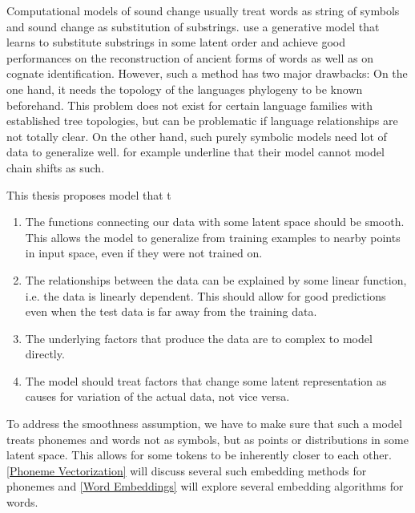 \documentclass[8pt]{article}
\begin{document}
Computational models of sound change usually treat words as string of symbols and sound change as substitution of substrings.\cite{bouchard2007probabilistic,bouchard2013automated} use a generative model that learns to substitute substrings in some latent order and achieve good performances on the reconstruction of ancient forms of words as well as on cognate identification. However, such a method has two major drawbacks: On the one hand, it needs the topology of the languages phylogeny to be known beforehand. This problem does not exist for certain language families with established tree topologies, but can be problematic if language relationships are not totally clear. On the other hand, such purely symbolic models need lot of data to generalize well. \cite{bouchard2007probabilistic} for example underline that their model cannot model chain shifts as such.

This thesis proposes model that t
\begin{enumerate}
\item The functions connecting our data with some latent space should be smooth. This allows the model to generalize from training examples to nearby points in input space, even if they were not trained on.
\item The relationships between the data can be explained by some linear function, i.e. the data is linearly dependent. This should allow for good predictions even when the test data is far away from the training data.
\item The underlying factors that produce the data are to complex to model directly. 
\item The model should treat factors that change some latent representation as causes for variation of the actual data, not vice versa.
\end{enumerate}

To address the smoothness assumption, we have to make sure that such a model treats phonemes and words not as symbols, but as points or distributions in some latent space. This allows for some tokens to be inherently closer to each other. \ref{Phoneme Vectorization} will discuss several such embedding methods for phonemes and \ref{Word Embeddings} will explore several embedding algorithms for words.  




\end{document}
